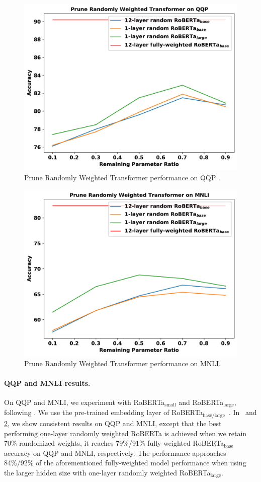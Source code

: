 \begin{figure}
    \centering
    \includegraphics[width=0.8\linewidth]{fig/qqp.pdf}
    \caption{Prune Randomly Weighted Transformer performance on QQP .}
    \label{fig:qqp_base}
\end{figure}

\begin{figure}
    \centering
    \includegraphics[width=0.8\linewidth]{fig/mnli.pdf}
    \caption{ Prune Randomly Weighted Transformer performance on MNLI.}
    \label{fig:mnli_base}
\end{figure}


\paragraph{QQP and MNLI results.} 
On QQP and MNLI, we experiment with RoBERTa$_\text{small}$ and RoBERTa$_\text{large}$, following \citet{Liu:2019roberta}. We use the pre-trained embedding layer of RoBERTa$_\text{base/large}$~\citep{Liu:2019roberta}. 
In~ and \ref{fig:mnli_base}, we show consistent results on QQP and MNLI, except that the best performing one-layer randomly weighted RoBERTa is achieved when we retain 70\% randomized weights, it reaches 79\%/91\% fully-weighted RoBERTa$_\text{base}$ accuracy on QQP and MNLI, respectively.  
The performance approaches 84\%/92\% of the aforementioned fully-weighted model performance when using the larger hidden size with one-layer randomly weighted RoBERTa$_\text{large}$. 

